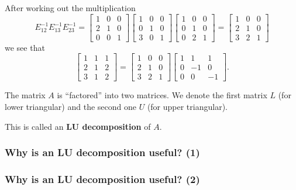 \begin{frame}
After working out the multiplication
\[
E_{12}^{-1}E_{13}^{-1}E_{23}^{-1} =
\begin{bmatrix}
  1 & 0 & 0 \\
  2 & 1 & 0 \\
  0 & 0 & 1
\end{bmatrix}
\begin{bmatrix}
  1 & 0 & 0 \\
  0 & 1 & 0 \\
  3 & 0 & 1
\end{bmatrix}
\begin{bmatrix}
  1 & 0 & 0 \\
  0 & 1 & 0 \\
  0 & 2 & 1
\end{bmatrix}
=
\begin{bmatrix}
  1 & 0 & 0 \\
  2 & 1 & 0 \\
  3 & 2 & 1
\end{bmatrix}
\]
we see that
\[
\begin{bmatrix}
  1 & 1 & 1 \\
  2 & 1 & 2 \\
  3 & 1 & 2
\end{bmatrix}
=
\begin{bmatrix}
  1 & 0 & 0 \\
  2 & 1 & 0 \\
  3 & 2 & 1
\end{bmatrix}
\begin{bmatrix}
  1 & 1 & 1 \\
  0 & -1 & 0 \\
  0 & 0 & -1
\end{bmatrix}.
\]

The matrix $A$ is ``factored'' into two matrices.  We denote the first
matrix $L$ (for lower triangular) and the second one $U$ (for upper
triangular).

This is called an {\bf LU decomposition} of $A$.

\end{frame}

\begin{frame}
  \frametitle{Why is an LU decomposition useful? (1)}
\end{frame}

\begin{frame}
  \frametitle{Why is an LU decomposition useful? (2)}
\end{frame}
